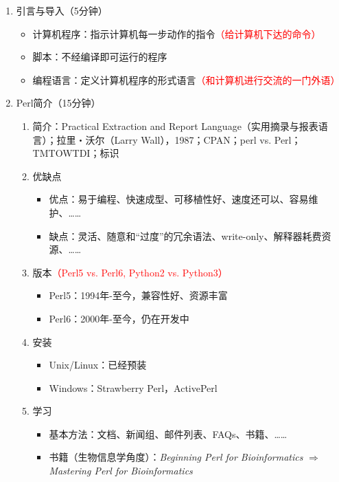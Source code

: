 \documentclass{TIJMUjiaoanLL}
\begin{document}
\begin{enumerate}
  \item 引言与导入（5分钟）
    \begin{itemize}
      \item 计算机程序：指示计算机每一步动作的指令\textcolor{red}{（给计算机下达的命令）}
      \item 脚本：不经编译即可运行的程序
      \item 编程语言：定义计算机程序的形式语言\textcolor{red}{（和计算机进行交流的一门外语）}
    \end{itemize}
  \item Perl简介（15分钟）
    \begin{enumerate}
      \item 简介：Practical Extraction and Report Language（实用摘录与报表语言）；拉里・沃尔（Larry Wall），1987；CPAN；perl vs. Perl；TMTOWTDI；标识
      \item 优缺点
	\begin{itemize}
	  \item 优点：易于编程、快速成型、可移植性好、速度还可以、容易维护、……
	  \item 缺点：灵活、随意和“过度”的冗余语法、write-only、解释器耗费资源、……
	\end{itemize}
      \item 版本\textcolor{red}{（Perl5 vs. Perl6, Python2 vs. Python3）}
	\begin{itemize}
	  \item Perl5：1994年-至今，兼容性好、资源丰富
	  \item Perl6：2000年-至今，仍在开发中
	\end{itemize}
      \item 安装
	\begin{itemize}
	  \item Unix/Linux：已经预装
	  \item Windows：Strawberry Perl，ActivePerl
	\end{itemize}
      \item 学习
	\begin{itemize}
	  \item 基本方法：文档、新闻组、邮件列表、FAQs、书籍、……
	  \item 书籍（生物信息学角度）：\textit{Beginning Perl for Bioinformatics} $\Rightarrow$ \textit{Mastering Perl for Bioinformatics}

\end{itemize}
\end{enumerate}
\end{enumerate}
\end{document}
